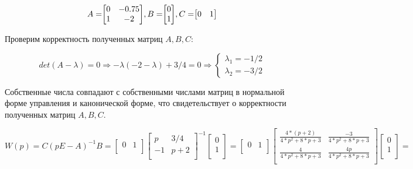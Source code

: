 \documentclass[14pt,a4paper,report]{report}
\begin{document}
\begin{equation*}
\text{$A=$}
\text{$
	\begin{bmatrix}
	0 & -0.75 \\
	1 & -2 \\
	\end{bmatrix}
	$}
\text{$, B=$}
\text{$
	\begin{bmatrix}
	0 \\
	1 \\
	\end{bmatrix}
	$}
\text{$, C=$}
\text{$
	\begin{bmatrix}
	0 & 1 \\
	\end{bmatrix}
	$}
\end{equation*}

Проверим корректность полученных матриц $A, B, C$:

\begin{equation*}
\text{$det(A-\lambda)=0$}
\Longrightarrow
\text{$-\lambda(-2-\lambda) + 3/4=0$}
\Longrightarrow
\begin{cases}
	\text{$\lambda_1=-1/2$} \\
	\text{$\lambda_2=-3/2$}
\end{cases}
\end{equation*}

Собственные числа совпадают с собственными числами матриц в нормальной форме управления и канонической форме, что свидетельствует о корректности полученных матриц  $A, B, C$.

\begin{equation*}
\text{$W(p)=C(pE-A)^{-1}B=
\begin{bmatrix}
0 & 1 \\
\end{bmatrix}
\begin{bmatrix}
p & 3/4 \\
-1 & p+2\\
\end{bmatrix}^{-1}
\begin{bmatrix}
0 \\
1 \\
\end{bmatrix}=
\begin{bmatrix}
0 & 1 \\
\end{bmatrix}
\begin{bmatrix}
\frac{4*(p + 2)}{4*p^2 + 8*p + 3} & \frac{-3}{4*p^2 + 8*p + 3} \\
\frac{4}{4*p^2 + 8*p + 3} & \frac{4p}{4*p^2 + 8*p + 3}\\
\end{bmatrix}
\begin{bmatrix}
0 \\
1 \\
\end{bmatrix}=
$}
\end{equation*}
\end{document}
